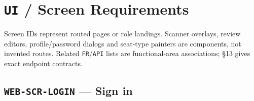 \clearpage
\section{\texttt{UI} /\allowbreak{} Screen Requirements}\label{sec:srs-12}
Screen IDs represent routed pages or role landings. Scanner overlays, review editors, profile/\allowbreak{}password dialogs and seat-type painters are components, not invented routes. Related \texttt{FR}/\allowbreak{}\texttt{API} lists are functional-area associations; §13 gives exact endpoint contracts.

\subsection{\texttt{WEB-\allowbreak{}SCR-\allowbreak{}LOGIN} — Sign in}
\begingroup
\fontsize{9.5}{12}\selectfont
\setlength{\SRSWidth}{\dimexpr\linewidth-2\tabcolsep\relax}
